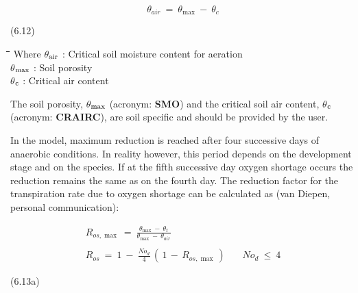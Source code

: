 \documentclass[11pt]{article}
\begin{document}
\begin{displaymath}
\theta  _{air} ~=~ \theta _{\max } ~-~\theta  _{c} 
\end{displaymath}

 \bigskip
\strut\hfill (6.12)
\nwln
\begin{tabbing}
\hspace{1.27cm}\=\hspace{1.27cm}\=\hspace{1.27cm}\=\hspace{1.27cm}\=%
\hspace{1.27cm}\=\hspace{1.27cm}\=\hspace{1.27cm}\=\hspace{1.27cm}\=%
\hspace{1.27cm}\=\hspace{1.27cm}\=\kill
Where\> \> $\theta$$_{{\rm air}}$\> : Critical soil moisture content for aeration\> \> \> \> \> \> \> [cm$^{{\rm 3}}$ cm$^{{\rm -3}}$]\\
\>\> $\theta$$_{{\rm max}}$\> : Soil porosity\> \> \> \> \> \> \> [cm$^{{\rm 3}}$ cm$^{{\rm -3}}$]\\
\>\> $\theta$$_{{\rm c}}$\> : Critical air content\> \> \> \> \> \> \> [cm$^{{\rm 3}}$ cm$^{{\rm -3}}$]
\end{tabbing}

\bigskip
The soil porosity, {\bf $\theta$$_{{\rm max}}$} (acronym: {\bf SMO}) and the critical soil air content, {\bf $\theta$$_{{\rm c}}$} (acronym:
{\bf CRAIRC}), are soil specific and should be provided by the user. 

\bigskip
In the model, maximum reduction is reached after four successive days of anaerobic
conditions. In reality however, this period depends on the development stage and on the
species. If at the fifth successive day oxygen shortage occurs the reduction remains the
same as on the fourth day. The reduction factor for the transpiration rate due to oxygen
shortage {\nobreak}can be calculated as (van Diepen, personal communication):

\begin{eqnarray*}
R _{os,\max } ~=~{\frac{ \theta  _{\max } ~-~ \theta  _{t} }{\theta _{\max } ~-~ \theta  _{air} }} \nonumber  \\
~ \nonumber  \\
R _{os} ~=~ 1~-~{\frac{No _{d} }{4}} \, (\, 1\, -\, R _{os,\max } \, )~~~~~~~~No _{d} ~\le ~ 4
\end{eqnarray*}

 \bigskip
\strut\hfill (6.13a)
\end{document}

